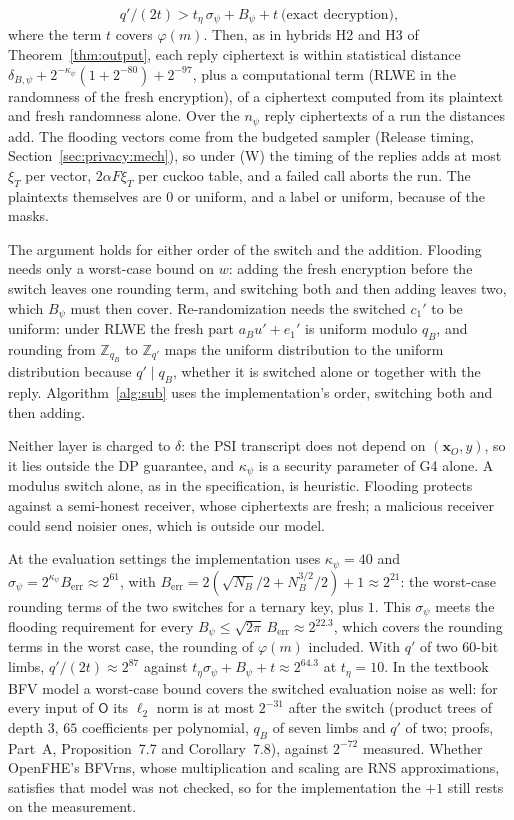 \documentclass[11pt]{article}
\theoremstyle{definition}
\theoremstyle{plain}
\newcommand{\Z}{\mathbb{Z}}
\newcommand{\bx}{\mathbf{x}}
\newcommand{\Party}[1]{\textsf{#1}}
\newcommand{\Op}{\Party{O}}
\begin{document}
\begin{enumerate}[noitemsep, label=(\alph*)]
\[    q'/(2t) > t_\eta\,\sigma_\psi + B_\psi + t \ \text{(exact decryption)},
  \]
  where the term $t$ covers $\varphi(m)$. Then, as in hybrids H2 and H3 of Theorem~\ref{thm:output}, each reply ciphertext is within statistical distance $\delta_{B,\psi} + 2^{-\kappa_\psi}(1 + 2^{-80}) + 2^{-97}$, plus a computational term (RLWE in the randomness of the fresh encryption), of a ciphertext computed from its plaintext and fresh randomness alone. Over the $n_\psi$ reply ciphertexts of a run the distances add. The flooding vectors come from the budgeted sampler (Release timing, Section~\ref{sec:privacy:mech}), so under (W) the timing of the replies adds at most $\xi_T$ per vector, $2\alpha F\xi_T$ per cuckoo table, and a failed call aborts the run. The plaintexts themselves are $0$ or uniform, and a label or uniform, because of the masks.

  The argument holds for either order of the switch and the addition. Flooding needs only a worst-case bound on $w$: adding the fresh encryption before the switch leaves one rounding term, and switching both and then adding leaves two, which $B_\psi$ must then cover. Re-randomization needs the switched $c_1'$ to be uniform: under RLWE the fresh part $a_Bu' + e_1'$ is uniform modulo $q_B$, and rounding from $\Z_{q_B}$ to $\Z_{q'}$ maps the uniform distribution to the uniform distribution because $q' \mid q_B$, whether it is switched alone or together with the reply. Algorithm~\ref{alg:sub} uses the implementation's order, switching both and then adding.
\end{enumerate}
Neither layer is charged to $\delta$: the PSI transcript does not depend on $(\bx_O, y)$, so it lies outside the DP guarantee, and $\kappa_\psi$ is a security parameter of G4 alone. A modulus switch alone, as in the specification, is heuristic. Flooding protects against a semi-honest receiver, whose ciphertexts are fresh; a malicious receiver could send noisier ones, which is outside our model.

At the evaluation settings the implementation uses $\kappa_\psi = 40$ and $\sigma_\psi = 2^{\kappa_\psi}B_{\mathrm{err}} \approx 2^{61}$, with $B_{\mathrm{err}} = 2(\sqrt{N_B}/2 + N_B^{3/2}/2) + 1 \approx 2^{21}$: the worst-case rounding terms of the two switches for a ternary key, plus $1$. This $\sigma_\psi$ meets the flooding requirement for every $B_\psi \le \sqrt{2\pi}\,B_{\mathrm{err}} \approx 2^{22.3}$, which covers the rounding terms in the worst case, the rounding of $\varphi(m)$ included. With $q'$ of two 60-bit limbs, $q'/(2t) \approx 2^{87}$ against $t_\eta\sigma_\psi + B_\psi + t \approx 2^{64.3}$ at $t_\eta = 10$. In the textbook BFV model a worst-case bound covers the switched evaluation noise as well: for every input of $\Op$ its $\ell_2$ norm is at most $2^{-31}$ after the switch (product trees of depth $3$, $65$ coefficients per polynomial, $q_B$ of seven limbs and $q'$ of two; proofs, Part~A, Proposition~7.7 and Corollary~7.8), against $2^{-72}$ measured. Whether OpenFHE's BFVrns, whose multiplication and scaling are RNS approximations, satisfies that model was not checked, so for the implementation the $+1$ still rests on the measurement.
\end{document}
